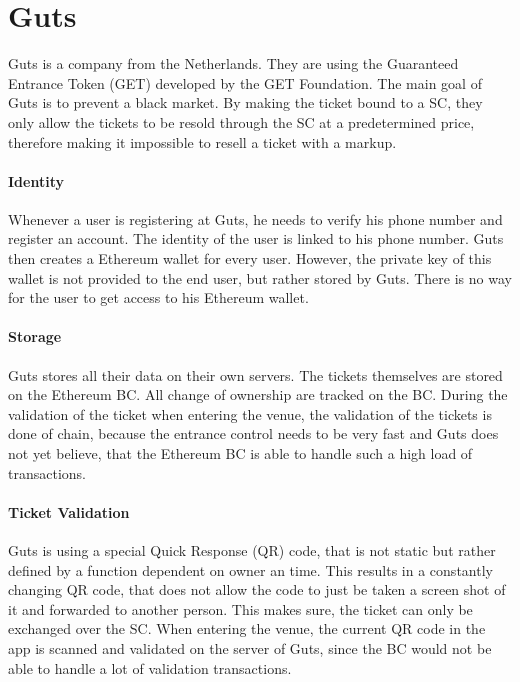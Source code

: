 
\section{Guts}
Guts \cite{GET_PROTOCOL} is a company from the Netherlands. They are using the Guaranteed Entrance Token (GET) developed by the GET Foundation. The main goal of Guts is to prevent a black market. By making the ticket bound to a SC, they only allow the tickets to be resold through the SC at a predetermined price, therefore making it impossible to resell a ticket with a markup.

\paragraph{Identity}
Whenever a user is registering at Guts, he needs to verify his phone number and register an account. The identity of the user is linked to his phone number. Guts then creates a Ethereum wallet for every user. However, the private key of this wallet is not provided to the end user, but rather stored by Guts. There is no way for the user to get access to his Ethereum wallet.


\paragraph{Storage}
Guts stores all their data on their own servers. The tickets themselves are stored on the Ethereum BC. All change of ownership are tracked on the BC. During the validation of the ticket when entering the venue, the validation of the tickets is done of chain, because the entrance control needs to be very fast and Guts does not yet believe, that the Ethereum BC is able to handle such a high load of transactions.

\paragraph{Ticket Validation}
Guts is using a special Quick Response (QR) code, that is not static but rather defined by a function dependent on owner an time. This results in a constantly changing QR code, that does not allow the code to just be taken a screen shot of it and forwarded to another person. This makes sure, the ticket can only be exchanged over the SC. When entering the venue, the current QR code in the app is scanned and validated on the server of Guts, since the BC would not be able to handle a lot of validation transactions.


